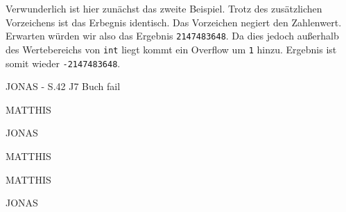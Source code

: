 \documentclass[times, 10pt,twocolumn]{article}
\begin{document}
Verwunderlich ist hier zunächst das zweite Beispiel. Trotz des zusätzlichen Vorzeichens ist das Erbegnis identisch. Das Vorzeichen negiert den Zahlenwert. Erwarten würden wir also das Ergebnis \texttt{2147483648}. Da dies jedoch außerhalb des Wertebereichs von \texttt{int} liegt kommt ein Overflow um \texttt{1} hinzu. Ergebnis ist somit wieder \texttt{-2147483648}.

JONAS - S.42 J7 Buch fail

MATTHIS

JONAS

MATTHIS


MATTHIS

JONAS


% 
% 
% 
% 
% 
% 
% 
% 




\jDocIndex
\end{document}
